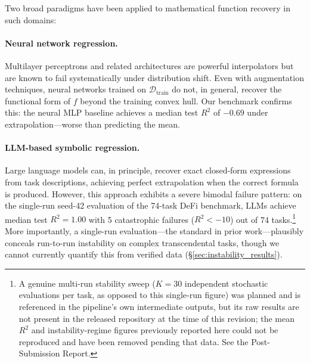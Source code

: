 \documentclass[twoside,11pt]{article}
\newcommand{\Rsq}{R^{2}}
\begin{document}
Two broad paradigms have been applied to mathematical function recovery in such
domains:

\paragraph{Neural network regression.}
Multilayer perceptrons and related architectures are powerful interpolators but
are known to fail systematically under distribution shift.  Even with augmentation
techniques, neural networks trained on $\mathcal{D}_{\mathrm{train}}$ do not, in
general, recover the functional form of $f$ beyond the training convex hull.  Our
benchmark confirms this: the neural MLP baseline achieves a median test $\Rsq$ of
$-0.69$ under extrapolation---worse than predicting the mean.

\paragraph{LLM-based symbolic regression.}
Large language models can, in principle, recover exact closed-form expressions from
task descriptions, achieving perfect extrapolation when the correct formula is
produced.  However, this approach exhibits a severe bimodal failure pattern: on
the single-run seed-42 evaluation of the 74-task DeFi benchmark, LLMs achieve
median test $\Rsq=1.00$ with 5 catastrophic failures ($\Rsq < -10$) out of 74
tasks.\footnote{A genuine multi-run stability sweep ($K=30$ independent
stochastic evaluations per task, as opposed to this single-run figure) was
planned and is referenced in the pipeline's own intermediate outputs, but its
raw results are not present in the released repository at the time of this
revision; the mean $\Rsq$ and instability-regime figures previously reported
here could not be reproduced and have been removed pending that data. See the
Post-Submission Report.} More importantly, a single-run evaluation---the
standard in prior work---plausibly conceals run-to-run instability on complex
transcendental tasks, though we cannot currently quantify this from verified
data (\S\ref{sec:instability_results}).
\end{document}
